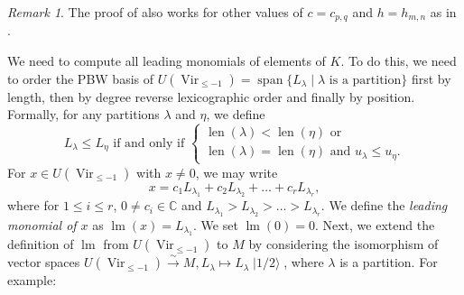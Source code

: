 \documentclass[a4paper, 12pt, reqno]{amsart}
\theoremstyle{remark}
\newtheorem{remark}[theorem]{Remark}
\DeclareMathOperator{\Vir}{Vir}
\DeclareMathOperator{\lm}{lm}
\DeclareMathOperator{\vspan}{span}
\DeclareMathOperator{\len}{len}
\DeclareMathOperator{\vachalf}{|1/2\rangle}
\begin{document}
\begin{remark}
  \label{rmk:48}
  The proof of  also works for other values of $c = c_{p, q}$ and $h = h_{m, n}$ as in .
\end{remark}

We need to compute all leading monomials of elements of $K$.
To do this, we need to order the PBW basis of $U(\Vir_{\le -1}) = \vspan\{L_{\lambda} \mid \text{$\lambda$ is a partition}\}$ first by length, then by degree reverse lexicographic order and finally by position.
Formally, for any partitions $\lambda$ and $\eta$, we define
\begin{equation*}
  L_{\lambda} \le L_{\eta}\text{ if and only if }
  \begin{cases}
    \len(\lambda) < \len(\eta)\text{ or } \\
    \len(\lambda) = \len(\eta)\text{ and }u_{\lambda} \le u_{\eta}.
  \end{cases}
\end{equation*}
For $x \in U(\Vir_{\le -1})$ with $x \neq 0$, we may write
\begin{equation*}
  x = c_1L_{\lambda_1} + c_2L_{\lambda_2} + \dots + c_rL_{\lambda_r},
\end{equation*}
where for $1 \le i \le r$, $0 \neq c_i \in \mathbb{C}$ and $L_{\lambda_1} > L_{\lambda_2} > \dots > L_{\lambda_r}$.
We define the \emph{leading monomial of $x$} as $\lm(x) = L_{\lambda_1}$.
We set $\lm(0) = 0$.
Next, we extend the definition of $\lm$ from $U(\Vir_{\le -1})$ to $M$ by considering the isomorphism of vector spaces $U(\Vir_{\le -1}) \xrightarrow{\sim} M, L_{\lambda} \mapsto L_{\lambda}\vachalf$, where $\lambda$ is a partition.
For example:
\end{document}
